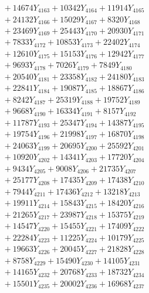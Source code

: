 \documentclass[a4paper,10pt]{article}
\begin{document}
{\begin{align}
&\;  + 14674 Y_{4163} + 10342 Y_{4164} + 11914 Y_{4165} \\[0.3ex]
&\;  + 24132 Y_{4166} + 15029 Y_{4167} + 8320 Y_{4168} \\[0.5ex]\allowbreak
&\;  + 23469 Y_{4169} + 25443 Y_{4170} + 20930 Y_{4171} \\[0.3ex]
&\;  + 7833 Y_{4172} + 10853 Y_{4173} + 22402 Y_{4174} \\[0.3ex]
&\;  + 12610 Y_{4175} + 15153 Y_{4176} + 12942 Y_{4177} \\[0.3ex]
&\;  + 9693 Y_{4178} + 7026 Y_{4179} + 7849 Y_{4180} \\[0.3ex]
&\;  + 20540 Y_{4181} + 23358 Y_{4182} + 24180 Y_{4183} \\[0.3ex]
&\;  + 22841 Y_{4184} + 19087 Y_{4185} + 18867 Y_{4186} \\[0.3ex]
&\;  + 8242 Y_{4187} + 25319 Y_{4188} + 19752 Y_{4189} \\[0.3ex]
&\;  + 9668 Y_{4190} + 16334 Y_{4191} + 8157 Y_{4192} \\[0.3ex]
&\;  + 11787 Y_{4193} + 25347 Y_{4194} + 14387 Y_{4195} \\[0.3ex]
&\;  + 19754 Y_{4196} + 21998 Y_{4197} + 16870 Y_{4198} \\[0.5ex]\allowbreak
&\;  + 24063 Y_{4199} + 20695 Y_{4200} + 25592 Y_{4201} \\[0.3ex]
&\;  + 10920 Y_{4202} + 14341 Y_{4203} + 17720 Y_{4204} \\[0.3ex]
&\;  + 9434 Y_{4205} + 9008 Y_{4206} + 21735 Y_{4207} \\[0.3ex]
&\;  + 25177 Y_{4208} + 17435 Y_{4209} + 17438 Y_{4210} \\[0.3ex]
&\;  + 7944 Y_{4211} + 17436 Y_{4212} + 13218 Y_{4213} \\[0.3ex]
&\;  + 19911 Y_{4214} + 15843 Y_{4215} + 18420 Y_{4216} \\[0.3ex]
&\;  + 21265 Y_{4217} + 23987 Y_{4218} + 15375 Y_{4219} \\[0.3ex]
&\;  + 14547 Y_{4220} + 15455 Y_{4221} + 17409 Y_{4222} \\[0.3ex]
&\;  + 22284 Y_{4223} + 11225 Y_{4224} + 10179 Y_{4225} \\[0.3ex]
&\;  + 19663 Y_{4226} + 20045 Y_{4227} + 21828 Y_{4228} \\[0.5ex]\allowbreak
&\;  + 8758 Y_{4229} + 15490 Y_{4230} + 14105 Y_{4231} \\[0.3ex]
&\;  + 14165 Y_{4232} + 20768 Y_{4233} + 18732 Y_{4234} \\[0.3ex]
&\;  + 15501 Y_{4235} + 20002 Y_{4236} + 16968 Y_{4237} \\[0.3ex]

\end{align}}
\end{document}
